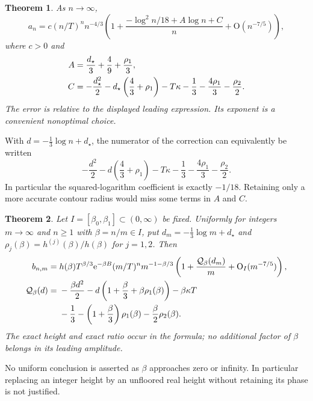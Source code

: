 \documentclass[11pt,letterpaper]{article}
\newtheorem{theorem}{Theorem}[section]
\theoremstyle{remark}\newtheorem{remark}[theorem]{Remark}
\newcommand{\Oh}{\mathrm O}\newcommand{\supp}{\operatorname{supp}}
\begin{document}
\begin{theorem}\label{ied:corr:thm:diagonal}
As $n\to\infty$,
\begin{equation}\label{ied:corr:eq:main}
 a_n=c(n/T)^n n^{-4/3}
 \left(1+\frac{-\log^2n/18+A\log n+C}{n}
                  +\Oh(n^{-7/5})\right),
\end{equation}
where $c>0$ and
\begin{align}\label{ied:corr:eq:AC}
 A&=\frac{d_\star}3+\frac49+\frac{\rho_1}3,\\
 C&=-\frac{d_\star^2}2-d_\star\left(\frac43+\rho_1\right)
       -T\kappa-\frac13-\frac{4\rho_1}3-\frac{\rho_2}2.\notag
\end{align}
The error is relative to the displayed leading expression. Its exponent is a convenient nonoptimal choice.
\end{theorem}
With $d=-\frac13\log n+d_\star$, the numerator of the correction can equivalently be written
\begin{equation}\label{ied:corr:eq:Qd}
 -\frac{d^2}2-d\left(\frac43+\rho_1\right)-T\kappa
             -\frac13-\frac{4\rho_1}3-\frac{\rho_2}2.
\end{equation}
In particular the squared-logarithm coefficient is exactly $-1/18$. Retaining only a more accurate contour radius would miss some terms in $A$ and $C$.

\begin{theorem}\label{ied:corr:thm:height}
Let $I=[\beta_0,\beta_1]\subset(0,\infty)$ be fixed. Uniformly for integers $m\to\infty$ and $n\ge1$ with $\beta=n/m\in I$, put $d_m=-\frac13\log m+d_\star$ and
$\rho_j(\beta)=h^{(j)}(\beta)/h(\beta)$ for $j=1,2$. Then
\begin{align}\label{ied:corr:eq:height}
 b_{n,m}={}&h(\beta)T^{\beta/3}\e^{-\beta B}
 (m/T)^n m^{-1-\beta/3}
 \left(1+\frac{\mathcal Q_\beta(d_m)}m+\Oh_I(m^{-7/5})\right),\\
 \mathcal Q_\beta(d)={}&-\frac{\beta d^2}2
 -d\left(1+\frac\beta3+\beta\rho_1(\beta)\right)-\beta\kappa T\notag\\
 &-\frac13-\left(1+\frac\beta3\right)\rho_1(\beta)
 -\frac\beta2\rho_2(\beta).\notag
\end{align}
The exact height and exact ratio occur in the formula; no additional factor of $\beta$ belongs in its leading amplitude.
\end{theorem}
No uniform conclusion is asserted as $\beta$ approaches zero or infinity. In particular replacing an integer height by an unfloored real height without retaining its phase is not justified.
\end{document}
